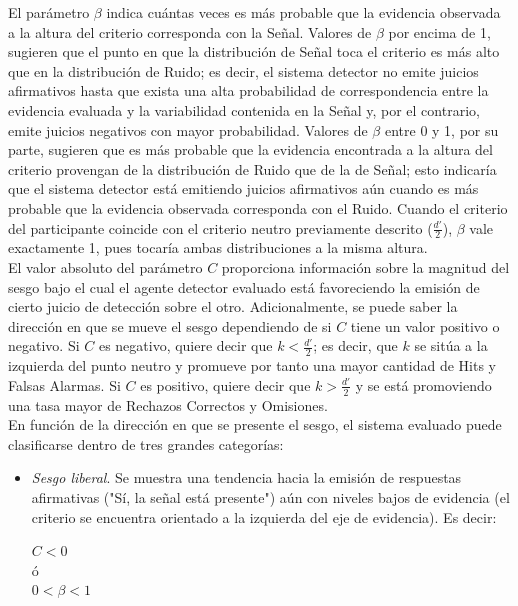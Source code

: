 \begin{itemize}
El parámetro $\beta$ indica cuántas veces es más probable que la evidencia observada a la altura del criterio corresponda con la Señal. Valores de $\beta$ por encima de 1, sugieren que el punto en que la distribución de Señal toca el criterio es más alto que en la distribución de Ruido; es decir, el sistema detector no emite juicios afirmativos hasta que exista una alta probabilidad de correspondencia entre la evidencia evaluada y la variabilidad contenida en la Señal y, por el contrario, emite juicios negativos con mayor probabilidad. Valores de $\beta$ entre 0 y 1, por su parte, sugieren que es más probable que la evidencia encontrada a la altura del criterio provengan de la distribución de Ruido que de la de Señal; esto indicaría que el sistema detector está emitiendo juicios afirmativos aún cuando es más probable que la evidencia observada corresponda con el Ruido. Cuando el criterio del participante coincide con el criterio neutro previamente descrito ($\frac{d'}{2}$), $\beta$ vale exactamente 1, pues tocaría ambas distribuciones a la misma altura.\\

El valor absoluto del parámetro $C$ proporciona información sobre la magnitud del sesgo bajo el cual el agente detector evaluado está favoreciendo la emisión de cierto juicio de detección sobre el otro. Adicionalmente, se puede saber la dirección en que se mueve el sesgo dependiendo de si $C$ tiene un valor positivo o negativo. Si $C$ es negativo, quiere decir que $k < \frac{d'}{2}$; es decir, que $k$ se sitúa a la izquierda del punto neutro y promueve por tanto una mayor cantidad de Hits y Falsas Alarmas. Si $C$ es positivo, quiere decir que $k > \frac{d'}{2}$ y se está promoviendo una tasa mayor de Rechazos Correctos y Omisiones.\\

En función de la dirección en que se presente el sesgo, el sistema evaluado puede clasificarse dentro de tres grandes categorías:\\

\begin{itemize}
\item \textsl{Sesgo liberal}. Se muestra una tendencia hacia la emisión de respuestas afirmativas ("Sí, la señal está presente") aún con niveles bajos de evidencia (el criterio se encuentra orientado a la izquierda del eje de evidencia). Es decir: \\
\begin{center}
$C < 0$\\
ó\\
$0 < \beta < 1$\\
\end{center}


\end{itemize}
\end{itemize}
